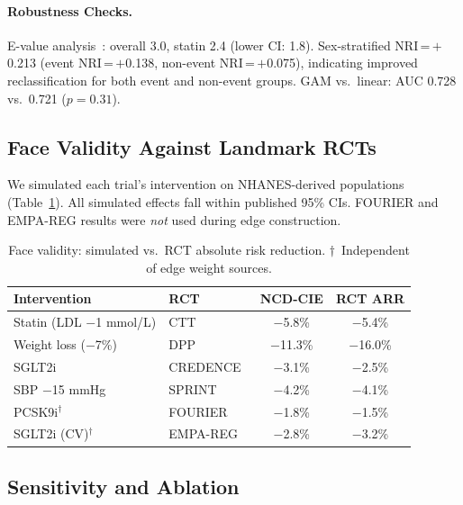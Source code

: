 \documentclass[runningheads]{llncs}
\begin{document}
\paragraph{Robustness Checks.}
E-value analysis~\cite{vanderweele2017evalue}: overall 3.0,
statin 2.4 (lower CI: 1.8).
Sex-stratified NRI\,=\,$+$0.213 (event NRI\,=\,$+$0.138,
non-event NRI\,=\,$+$0.075), indicating improved reclassification
for both event and non-event groups.
GAM vs.\ linear: AUC 0.728 vs.\ 0.721 ($p = 0.31$).

\subsection{Face Validity Against Landmark RCTs}\label{sec:faceval}

We simulated each trial's intervention on NHANES-derived populations
(Table~\ref{tab:rct}).
All simulated effects fall within published 95\% CIs.
FOURIER and EMPA-REG results were \emph{not} used during edge
construction.

\renewcommand{\arraystretch}{1.1}
\begin{table}[t]
\centering
\caption{Face validity: simulated vs.\ RCT absolute risk reduction.
$\dagger$~Independent of edge weight sources.}
\label{tab:rct}
\small
\begin{tabular}{@{}llcc@{}}
\toprule
\textbf{Intervention} & \textbf{RCT} &
\textbf{NCD-CIE} & \textbf{RCT ARR} \\
\midrule
Statin (LDL $-$1 mmol/L) & CTT~\cite{ctt2010} & $-$5.8\% & $-$5.4\% \\
Weight loss ($-$7\%) & DPP~\cite{knowler2002dpp} & $-$11.3\% & $-$16.0\% \\
SGLT2i & CREDENCE~\cite{perkovic2019credence} & $-$3.1\% & $-$2.5\% \\
SBP $-$15 mmHg & SPRINT~\cite{sprint2015} & $-$4.2\% & $-$4.1\% \\
PCSK9i$^\dagger$ & FOURIER~\cite{sabatine2017fourier} & $-$1.8\% & $-$1.5\% \\
SGLT2i (CV)$^\dagger$ & EMPA-REG~\cite{zinman2015empareg} & $-$2.8\% & $-$3.2\% \\
\bottomrule
\end{tabular}
\end{table}
\renewcommand{\arraystretch}{1.0}

\subsection{Sensitivity and Ablation}\label{sec:sensitivity}
\end{document}
